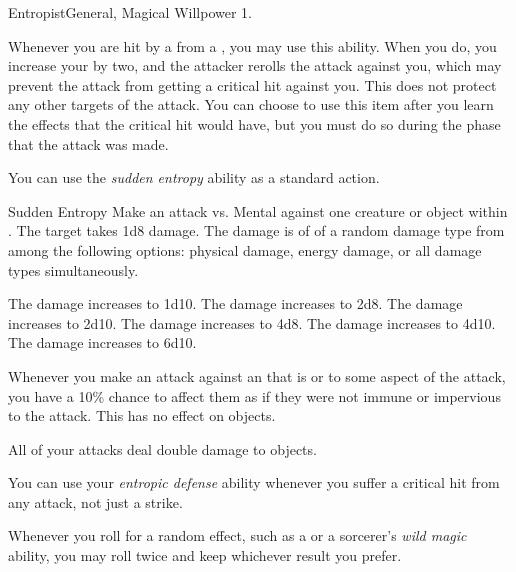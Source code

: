     \begin{feat}{Entropist}{General, Magical}
        \featpre Willpower 1.

         Whenever you are hit by a  from a , you may use this ability.
        When you do, you increase your  by two, and the attacker rerolls the attack against you, which may prevent the attack from getting a critical hit against you.
        This does not protect any other targets of the attack.
        You can choose to use this item after you learn the effects that the critical hit would have, but you must do so during the phase that the attack was made.

         You can use the \textit{sudden entropy} ability as a standard action.
        \begin{instantability}{Sudden Entropy}
            \rankline
            Make an attack vs. Mental against one creature or object within \medrange.
            \hit The target takes 1d8 \add {} damage.
            The damage is of of a random damage type from among the following options: physical damage, energy damage, or all damage types simultaneously.

            \rankline
             The damage increases to 1d10.
             The damage increases to 2d8.
             The damage increases to 2d10.
             The damage increases to 4d8.
             The damage increases to 4d10.
             The damage increases to 6d10.
        \end{instantability}

         Whenever you make an attack against an  that is  or  to some aspect of the attack, you have a 10\% chance to affect them as if they were not immune or impervious to the attack.
        This has no effect on objects.

         All of your attacks deal double damage to objects.

         You can use your \textit{entropic defense} ability whenever you suffer a critical hit from any attack, not just a strike.

         Whenever you roll for a random effect, such as a  or a sorcerer's \textit{wild magic} ability, you may roll twice and keep whichever result you prefer.


\end{feat}
